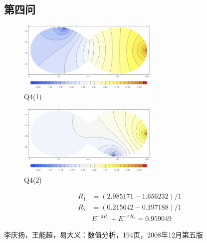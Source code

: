 \documentclass[10pt, a4paper]{article}
\begin{document}
    \subsection{第四问}
    \begin{figure}[H]
        \centering
        \includegraphics[width=0.6\textwidth]{Q4(1).png}
        \caption{Q4(1)}\label{fig:Q4(1)}
    \end{figure}
    \begin{figure}[H]
        \centering
        \includegraphics[width=0.6\textwidth]{Q4(2).png}
        \caption{Q4(2)}\label{fig:Q4(2)}
    \end{figure}

    \begin{align*}
        R_1&=(2.985171-1.656232 )/1\\
        R_2&=(0.215642-0.197188 )/1\\
        &E^{-\pi R_1}+E^{-\pi R_2}=0.959049
    \end{align*}

    \begin{thebibliography}{99}  
        李庆扬，王能超，易大义：数值分析，194页，2008年12月第五版
    \end{thebibliography}
\end{document}
